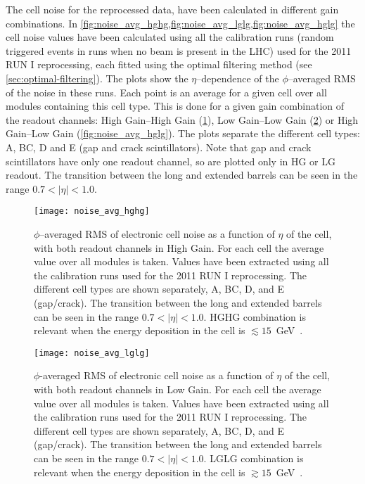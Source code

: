The cell noise for the reprocessed data, have been calculated in different gain
combinations. In \cref{fig:noise_avg_hghg,fig:noise_avg_lglg,fig:noise_avg_hglg}
the cell noise values have been calculated using all the calibration runs
(random triggered events in runs when no beam is present in the LHC) used for
the 2011 RUN I reprocessing, each fitted using the optimal filtering method (see
\cref{sec:optimal-filtering}). The plots show the $\eta$--dependence of the
$\phi$--averaged RMS of the noise in these runs. Each point is an average for a
given cell over all modules containing this cell type. This is done for a given
gain combination of the readout channels: High Gain--High Gain
(\cref{fig:noise_avg_hghg}), Low Gain--Low Gain (\cref{fig:noise_avg_lglg}) or
High Gain--Low Gain (\cref{fig:noise_avg_hglg}). The plots separate the
different cell types: A, BC, D and E (gap and crack scintillators). Note that
gap and crack scintillators have only one readout channel, so are plotted only
in HG or LG readout. The transition between the long and extended barrels can be
seen in the range $0.7 < |\eta| < 1.0$.


\begin{figure}[!h]
  \centering
    \texttt{[image: noise\_avg\_hghg]}
    \caption{$\phi$--averaged RMS of electronic cell noise as a function of
      $\eta$ of the cell, with both readout channels in High Gain. For each cell
      the average value over all modules is taken. Values have been extracted
      using all the calibration runs used for the 2011 RUN I reprocessing. The
      different cell types are shown separately, A, BC, D, and E
      (gap/crack). The transition between the long and extended barrels can be
      seen in the range $0.7 < |\eta| < 1.0$. HGHG combination is relevant when
      the energy deposition in the cell is
      $\lesssim 15$~GeV~\cite{MyTileCalPlots}.}
    \label{fig:noise_avg_hghg}
\end{figure}

\begin{figure}[!h]
  \centering
    \texttt{[image: noise\_avg\_lglg]}
    \caption{$\phi$-averaged RMS of electronic cell noise as a function of
      $\eta$ of the cell, with both readout channels in Low Gain. For each cell
      the average value over all modules is taken. Values have been extracted
      using all the calibration runs used for the 2011 RUN I reprocessing. The
      different cell types are shown separately, A, BC, D, and E
      (gap/crack). The transition between the long and extended barrels can be
      seen in the range $0.7 < |\eta| < 1.0$. LGLG combination is relevant when
      the energy deposition in the cell is
      $\gtrsim 15$~GeV~\cite{MyTileCalPlots}.}
    \label{fig:noise_avg_lglg}
\end{figure}

